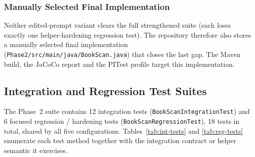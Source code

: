 \documentclass[journal]{IEEEtran}
\begin{document}
\subsubsection{Manually Selected Final Implementation}
Neither edited-prompt variant clears the full strengthened suite (each
loses exactly one helper-hardening regression test). The repository
therefore also stores a manually selected final implementation
(\texttt{Phase2/src/main/java/BookScan.java}) that closes the last gap.
The Maven build, the JaCoCo report and the PITest profile target this
implementation.

\subsection{Integration and Regression Test Suites}

The Phase~2 suite contains 12 integration tests
(\texttt{BookScanIntegrationTest}) and 6 focused regression / hardening
tests (\texttt{BookScanRegressionTest}), 18 tests in total, shared by all
five configurations. Tables~\ref{tab:int-tests} and \ref{tab:reg-tests}
enumerate each test method together with the integration contract or
helper semantic it exercises.
\end{document}
